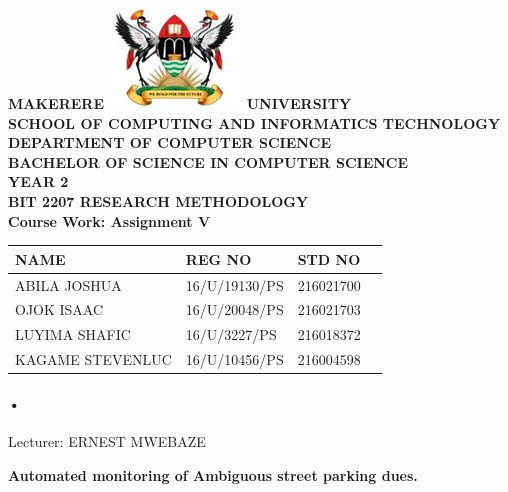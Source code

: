 \documentclass[12pt]{article}
\begin{document}
\begin{Huge}
\begin{center}
\begin{normalsize}
\textbf{MAKERERE \includegraphics[scale=0.5]{logo} UNIVERSITY }\\

\textbf{SCHOOL OF COMPUTING AND INFORMATICS TECHNOLOGY} \\
\textbf{DEPARTMENT OF COMPUTER SCIENCE} \\
\textbf{BACHELOR OF SCIENCE IN COMPUTER SCIENCE} \\
\textbf{YEAR 2} \\
\textbf{BIT 2207 RESEARCH METHODOLOGY} \\
\textbf{Course Work: Assignment V}
\end{normalsize}
\end{center}
\end{Huge}

\begin{center}
\begin{tabular}{|l|l|l|c|}
\hline NAME  & REG NO & STD NO \\\hline
ABILA JOSHUA& 16/U/19130/PS & 216021700 \\\hline
OJOK ISAAC& 16/U/20048/PS& 216021703 \\\hline
LUYIMA SHAFIC& 16/U/3227/PS	 & 216018372 \\\hline
KAGAME STEVENLUC&16/U/10456/PS  & 216004598\\\hline
\end{tabular}

\paragraph{•}
Lecturer: ERNEST MWEBAZE \\


\end{center}

\newpage

\begin{center}
\textbf{\sc Automated monitoring of Ambiguous street parking dues.}\\
\end{center}
\end{document}
